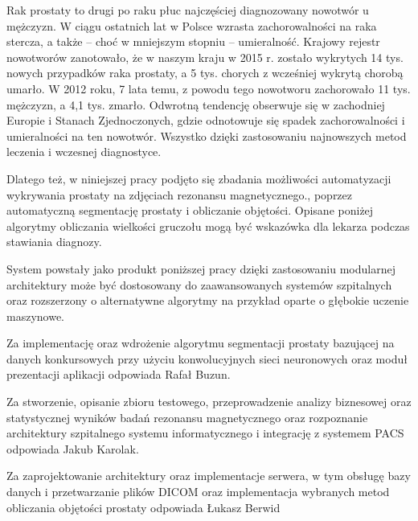 \documentclass[a4paper,11pt,twoside]{report}
\theoremstyle{definition}
\begin{document}
Rak prostaty to drugi po raku płuc najczęściej diagnozowany nowotwór u mężczyzn. W ciągu ostatnich lat w Polsce wzrasta zachorowalności na raka stercza, a także – choć w mniejszym stopniu – umieralność. Krajowy rejestr nowotworów zanotowało, że w naszym kraju w 2015 r. zostało wykrytych 14 tys. nowych przypadków raka prostaty, a 5 tys. chorych z wcześniej wykrytą chorobą umarło. W 2012 roku, 7 lata temu, z powodu tego nowotworu zachorowało 11 tys. mężczyzn, a 4,1 tys. zmarło. Odwrotną tendencję obserwuje się w zachodniej Europie i Stanach Zjednoczonych, gdzie odnotowuje się spadek zachorowalności i umieralności na ten nowotwór. Wszystko dzięki zastosowaniu najnowszych metod leczenia i wczesnej diagnostyce. \cite{rynekZdrowia}
\par
Dlatego też, w niniejszej pracy podjęto się zbadania możliwości automatyzacji wykrywania prostaty na zdjęciach rezonansu magnetycznego., poprzez automatyczną segmentację prostaty i obliczanie objętości. Opisane poniżej algorytmy obliczania wielkości gruczołu mogą być wskazówka dla lekarza podczas stawiania diagnozy. 
\par
System powstały jako produkt poniższej pracy dzięki zastosowaniu modularnej architektury może być dostosowany do zaawansowanych systemów szpitalnych oraz rozszerzony o alternatywne algorytmy na przykład oparte o głębokie uczenie maszynowe.
\par
Za implementację oraz wdrożenie algorytmu segmentacji prostaty bazującej na danych konkursowych przy użyciu konwolucyjnych sieci neuronowych oraz moduł prezentacji aplikacji odpowiada Rafał Buzun.
\par
Za stworzenie, opisanie zbioru testowego, przeprowadzenie analizy biznesowej oraz statystycznej wyników badań rezonansu magnetycznego oraz rozpoznanie architektury szpitalnego systemu informatycznego i integrację z systemem PACS odpowiada Jakub Karolak.
\par
Za zaprojektowanie architektury oraz implementacje serwera, w tym obsługę bazy danych i przetwarzanie plików DICOM oraz implementacja wybranych metod obliczania objętości prostaty odpowiada Łukasz Berwid
\end{document}
